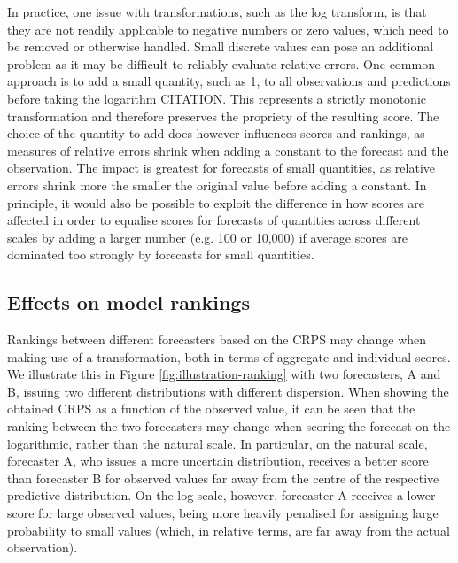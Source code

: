 \documentclass{article}
\begin{document}
In practice, one issue with transformations, such as the log transform, is that they are not readily applicable to negative numbers or zero values, which need to be removed or otherwise handled. Small discrete values can pose an additional problem as it may be difficult to reliably evaluate relative errors. 
One common approach is to add a small quantity, such as 1, to all observations and predictions before taking the logarithm CITATION. This represents a strictly monotonic transformation and therefore preserves the propriety of the resulting score. The choice of the quantity to add does however influences scores and rankings, as measures of relative errors shrink when adding a constant to the forecast and the observation. The impact is greatest for forecasts of small quantities, as relative errors shrink more the smaller the original value before adding a constant. In principle, it would also be possible to exploit the difference in how scores are affected in order to equalise scores for forecasts of quantities across different scales by adding a larger number (e.g. 100 or 10,000) if average scores are dominated too strongly by forecasts for small quantities. 

\subsection{Effects on model rankings}
\label{sec:methods:rankings}
Rankings between different forecasters based on the CRPS may change when making use of a transformation, both in terms of aggregate and individual scores. We illustrate this in Figure \ref{fig:illustration-ranking} with two forecasters, A and B, issuing two different distributions with different dispersion. When showing the obtained CRPS as a function of the observed value, it can be seen that the ranking between the two forecasters may change when scoring the forecast on the logarithmic, rather than the natural scale. In particular, on the natural scale, forecaster A, who issues a more uncertain distribution, receives a better score than forecaster B for observed values far away from the centre of the respective predictive distribution. On the log scale, however, forecaster A receives a lower score for large observed values, being more heavily penalised for assigning large probability to small values (which, in relative terms, are far away from the actual observation). 
\end{document}
